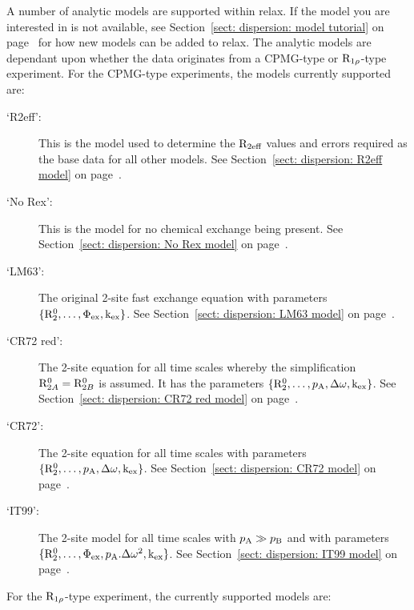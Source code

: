 A number of analytic models are supported within relax.
If the model you are interested in is not available, see Section~\ref{sect: dispersion: model tutorial} on page~\pageref{sect: dispersion: model tutorial} for how new models can be added to relax.
The analytic models are dependant upon whether the data originates from a CPMG-type or $\mathrm{R}_{1\rho}$-type experiment.
For the CPMG-type experiments, the models currently supported are:

\begin{description}
\item[`R2eff':]  This is the model used to determine the $\mathrm{R}_{2\textrm{eff}}$ values and errors required as the base data for all other models.  See Section~\ref{sect: dispersion: R2eff model} on page~\pageref{sect: dispersion: R2eff model}.
\item[`No Rex':]  This is the model for no chemical exchange being present.  See Section~\ref{sect: dispersion: No Rex model} on page~\pageref{sect: dispersion: No Rex model}.
\item[`LM63':]  The original \citet{LuzMeiboom63} 2-site fast exchange equation with parameters $\{\mathrm{R}_2^0, \dots, \Phi_\textrm{ex}, \textrm{k}_\textrm{ex}\}$.  See Section~\ref{sect: dispersion: LM63 model} on page~\pageref{sect: dispersion: LM63 model}.
\item[`CR72 red':]  The \citet{CarverRichards72} 2-site equation for all time scales whereby the simplification $\mathrm{R}_{2A}^0 = \mathrm{R}_{2B}^0$ is assumed.  It has the parameters $\{\mathrm{R}_2^0, \dots, p_\textrm{A}, \Delta\omega, \textrm{k}_\textrm{ex}\}$.  See Section~\ref{sect: dispersion: CR72 red model} on page~\pageref{sect: dispersion: CR72 red model}.
\item[`CR72':]  The \citet{CarverRichards72} 2-site equation for all time scales with parameters $\{\mathrm{R}_2^0, \dots, p_\textrm{A}, \Delta\omega, \textrm{k}_\textrm{ex}\}$.  See Section~\ref{sect: dispersion: CR72 model} on page~\pageref{sect: dispersion: CR72 model}.
\item[`IT99':]  The \citet{IshimaTorchia99} 2-site model for all time scales with $p_\textrm{A} \gg p_\textrm{B}$ and with parameters $\{\mathrm{R}_2^0, \dots, \Phi_\textrm{ex}, p_\textrm{A}.\Delta\omega^2, \textrm{k}_\textrm{ex}\}$.  See Section~\ref{sect: dispersion: IT99 model} on page~\pageref{sect: dispersion: IT99 model}.
\end{description}

For the $\mathrm{R}_{1\rho}$-type experiment, the currently supported models are:

